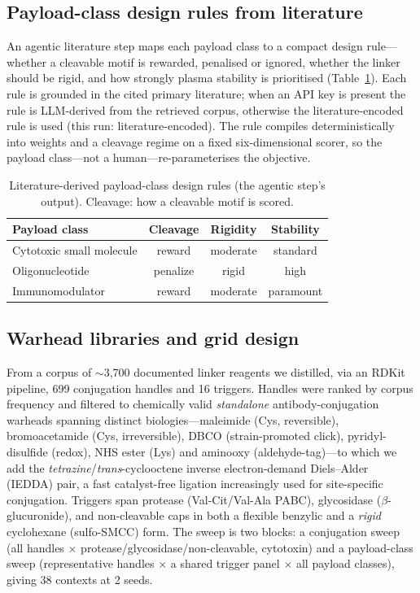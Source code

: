 \documentclass[10pt]{article}
\begin{document}
\subsection{Payload-class design rules from literature}
An agentic literature step maps each payload class to a compact design rule---whether a cleavable motif is rewarded, penalised or ignored, whether the linker should be rigid, and how strongly plasma stability is prioritised (Table~\ref{tab:rules}). Each rule is grounded in the cited primary literature; when an API key is present the rule is LLM-derived from the retrieved corpus, otherwise the literature-encoded rule is used (this run: literature-encoded). The rule compiles deterministically into weights and a cleavage regime on a fixed six-dimensional scorer, so the payload class---not a human---re-parameterises the objective.
\begin{table}[t]\centering\caption{Literature-derived payload-class design rules (the agentic step's output). Cleavage: how a cleavable motif is scored.}\label{tab:rules}\small
\begin{tabular}{l c c c}\toprule
Payload class & Cleavage & Rigidity & Stability \\ \midrule
Cytotoxic small molecule & reward & moderate & standard \\
Oligonucleotide & penalize & rigid & high \\
Immunomodulator & reward & moderate & paramount \\
\bottomrule\end{tabular}\end{table}
\subsection{Warhead libraries and grid design}
From a corpus of $\sim$3{,}700 documented linker reagents we distilled, via an RDKit pipeline, 699 conjugation handles and 16 triggers. Handles were ranked by corpus frequency and filtered to chemically valid \emph{standalone} antibody-conjugation warheads spanning distinct biologies---maleimide (Cys, reversible), bromoacetamide (Cys, irreversible), DBCO (strain-promoted click), pyridyl-disulfide (redox), NHS ester (Lys) and aminooxy (aldehyde-tag)---to which we add the \emph{tetrazine}/\emph{trans}-cyclooctene inverse electron-demand Diels--Alder (IEDDA) pair, a fast catalyst-free ligation increasingly used for site-specific conjugation. Triggers span protease (Val-Cit/Val-Ala PABC), glycosidase ($\beta$-glucuronide), and non-cleavable caps in both a flexible benzylic and a \emph{rigid} cyclohexane (sulfo-SMCC) form. The sweep is two blocks: a conjugation sweep (all handles $\times$ protease/glycosidase/non-cleavable, cytotoxin) and a payload-class sweep (representative handles $\times$ a shared trigger panel $\times$ all payload classes), giving 38 contexts at 2 seeds.
\end{document}
